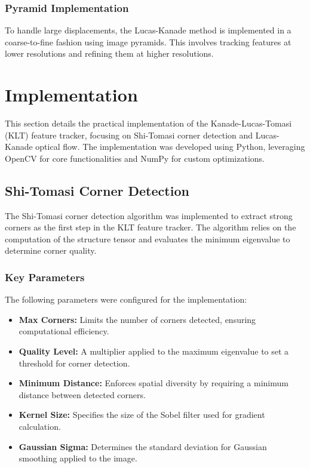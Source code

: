 \documentclass[11pt, conference, letterpaper]{IEEEtran}
\begin{document}
\subsubsection{Pyramid Implementation}
To handle large displacements, the Lucas-Kanade method is implemented in a coarse-to-fine fashion using image pyramids. This involves tracking features at lower resolutions and refining them at higher resolutions.

\section{Implementation}
This section details the practical implementation of the Kanade-Lucas-Tomasi (KLT) feature tracker, focusing on Shi-Tomasi corner detection and Lucas-Kanade optical flow. The implementation was developed using Python, leveraging OpenCV for core functionalities and NumPy for custom optimizations.

\subsection{Shi-Tomasi Corner Detection}
The Shi-Tomasi corner detection algorithm was implemented to extract strong corners as the first step in the KLT feature tracker. The algorithm relies on the computation of the structure tensor and evaluates the minimum eigenvalue to determine corner quality.

\subsubsection{Key Parameters}
The following parameters were configured for the implementation:
\begin{itemize}
    \item \textbf{Max Corners:} Limits the number of corners detected, ensuring computational efficiency.
    \item \textbf{Quality Level:} A multiplier applied to the maximum eigenvalue to set a threshold for corner detection.
    \item \textbf{Minimum Distance:} Enforces spatial diversity by requiring a minimum distance between detected corners.
    \item \textbf{Kernel Size:} Specifies the size of the Sobel filter used for gradient calculation.
    \item \textbf{Gaussian Sigma:} Determines the standard deviation for Gaussian smoothing applied to the image.
\end{itemize}
\end{document}
